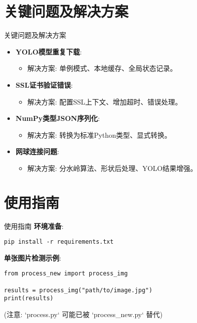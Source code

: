 \documentclass{beamer}
\begin{document}
\section{关键问题及解决方案}
\begin{frame}{关键问题及解决方案}
  \begin{itemize}
    \item \textbf{YOLO模型重复下载}:
    \begin{itemize}
        \item 解决方案: 单例模式、本地缓存、全局状态记录。
    \end{itemize}
    \item \textbf{SSL证书验证错误}:
    \begin{itemize}
        \item 解决方案: 配置SSL上下文、增加超时、错误处理。
    \end{itemize}
    \item \textbf{NumPy类型JSON序列化}:
    \begin{itemize}
        \item 解决方案: 转换为标准Python类型、显式转换。
    \end{itemize}
    \item \textbf{网球连接问题}:
    \begin{itemize}
        \item 解决方案: 分水岭算法、形状后处理、YOLO结果增强。
    \end{itemize}
  \end{itemize}
\end{frame}

\section{使用指南}
\begin{frame}{使用指南}
  \textbf{环境准备}:
  \begin{verbatim}
pip install -r requirements.txt
  \end{verbatim}
  \vspace{0.5cm}
  \textbf{单张图片检测示例}:
  \begin{verbatim}
from process_new import process_img

results = process_img("path/to/image.jpg")
print(results)
  \end{verbatim}
  (注意: `process.py` 可能已被 `process_new.py` 替代)
\end{frame}

\end{document}
